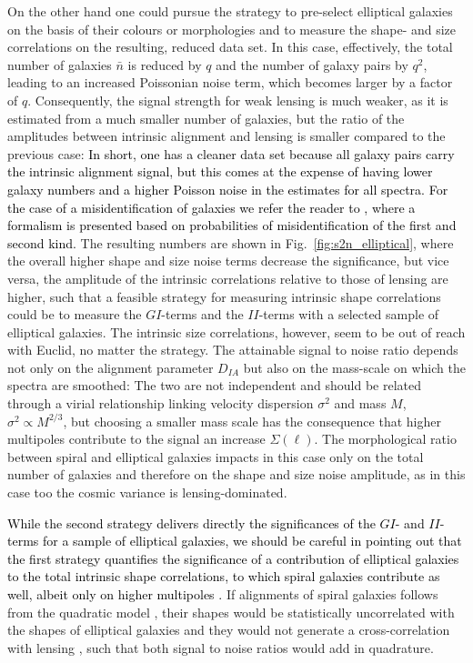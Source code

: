 \documentclass[a4paper,fleqn,usenatbib]{mnras}
\newcommand\spirou[1]{\textcolor{black}{#1}}
\begin{document}
On the other hand one could pursue the strategy to pre-select elliptical galaxies on the basis of their colours or morphologies and to measure the shape- and size correlations on the resulting, reduced data set. In this case, effectively, the total number of galaxies $\bar{n}$ is reduced by $q$ and the number of galaxy pairs by $q^2$, leading to an increased Poissonian noise term, which becomes larger by a factor of $q$. Consequently, the signal strength for weak lensing is much weaker, as it is estimated from a much smaller number of galaxies, but the ratio of the amplitudes between intrinsic alignment and lensing is smaller compared to the previous case: \spirou{In short, one has a cleaner data set because all galaxy pairs carry the intrinsic alignment signal, but this comes at the expense of having lower galaxy numbers and a higher Poisson noise in the estimates for all spectra. For the case of a misidentification of galaxies we refer the reader to \citet{tugendhat_statistical_2018}, where a formalism is presented based on probabilities of misidentification of the first and second kind.} The resulting numbers are shown in Fig.~\ref{fig:s2n_elliptical}, where the overall higher shape and size noise terms decrease the significance, but vice versa, the amplitude of the intrinsic correlations relative to those of lensing are higher, such that a feasible strategy for measuring intrinsic shape correlations could be to measure the $GI$-terms and the $II$-terms with a selected sample of elliptical galaxies. The intrinsic size correlations, however, seem to be out of reach with Euclid, no matter the strategy. The attainable signal to noise ratio depends not only on the alignment parameter $D_{IA}$ but also on the mass-scale on which the spectra are smoothed: The two are not independent and should be related through a virial relationship linking velocity dispersion $\sigma^2$ and mass $M$, $\sigma^2 \propto M^{2/3}$, but choosing a smaller mass scale has the consequence that higher multipoles contribute to the signal an increase $\Sigma(\ell)$. The morphological ratio between spiral and elliptical galaxies impacts in this case only on the total number of galaxies and therefore on the shape and size noise amplitude, as in this case too the cosmic variance is lensing-dominated. 

\spirou{While the second strategy delivers directly the significances of the $GI$- and $II$-terms for a sample of elliptical galaxies, we should be careful in pointing out that the first strategy quantifies the significance of a contribution of elliptical galaxies to the total intrinsic shape correlations, to which spiral galaxies contribute as well, albeit only on higher multipoles \citep{tugendhat_angular_2018}.} If alignments of spiral galaxies follows from the quadratic model \citep{crittenden_spin-induced_2001}, their shapes would be statistically uncorrelated with the shapes of elliptical galaxies and they would not generate a cross-correlation with lensing \citep{tugendhat_statistical_2018}, such that both signal to noise ratios would add in quadrature. 
\end{document}
